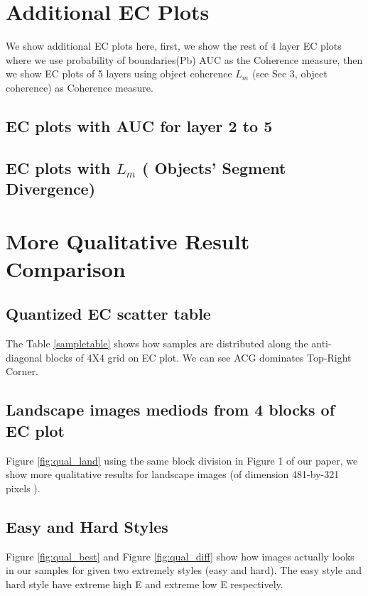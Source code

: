 \section{Additional EC Plots}
We show additional EC plots here, first, we show the rest of 4 layer EC plots where we use probability of boundaries(Pb) AUC as the Coherence measure, then we show EC plots of 5 layers using object coherence $L_m$ (see Sec 3, object coherence) as Coherence measure. 

\subsection{EC plots with AUC for layer 2 to 5}

\FloatBarrier
\subsection{EC plots with $L_m$ ( Objects' Segment Divergence)}






\section{More Qualitative Result Comparison }
\subsection{Quantized EC scatter table}
The Table \ref{sampletable} shows how samples are distributed along the anti-diagonal blocks of 4X4 grid on EC plot. We can see ACG dominates Top-Right Corner.


\subsection{ Landscape images mediods from 4 blocks of EC plot }
Figure \ref{fig:qual_land} using the same block division in Figure 1 of our paper, we show more qualitative results for landscape images (of dimension 481-by-321 pixels ).





\subsection{Easy and Hard Styles}
Figure \ref{fig:qual_best} and Figure \ref{fig:qual_diff}  show how images actually looks in our samples for given two extremely styles (easy and hard). The easy style and hard style have extreme high  E and  extreme low  E respectively.



